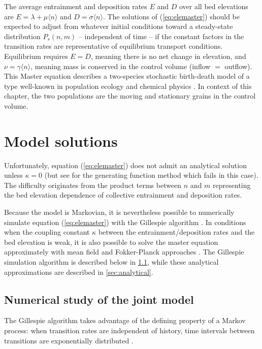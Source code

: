 The average entrainment and deposition rates $E$ and $D$ over all bed elevations are $E = \lambda +\mu \langle n \rangle$ and $D=\sigma \langle n \rangle$.
The solutions of (\ref{eq:elemaster}) should be expected to adjust from whatever initial conditions toward a steady-state distribution $P_s(n,m)$ -- independent of time -- if the constant factors in the transition rates are representative of equilibrium transport conditions.
Equilibrium requires $E=D$, meaning there is no net change in elevation, and $\nu = \gamma \langle n \rangle$, meaning mass is conserved in the control volume (inflow $=$ outflow).
This Master equation describes a two-species stochastic birth-death model \citep{Cox1965} of a type well-known in population ecology \citep{Pielou1977, Swift2002} and chemical physics \citep{Gardiner1983}.
In context of this chapter, the two populations are the moving and stationary grains in the control volume.

\section{Model solutions}
\label{sec:elesolution}

Unfortunately, equation (\ref{eq:elemaster}) does not admit an analytical solution unless $\kappa=0$ (but see \citet{Swift2002} for the generating function method which fails in this case).
The difficulty originates from the product terms between $n$ and $m$ representing the bed elevation dependence of collective entrainment and deposition rates.

Because the model is Markovian, it is nevertheless possible to numerically simulate equation (\ref{eq:elemaster}) with the Gillespie algorithm \citep{Gillespie1977, Gillespie1991, Gillespie2007}. 
In conditions when the coupling constant $\kappa$ between the entrainment/deposition rates and the bed elevation is weak, it is also possible to solve the master equation approximately with mean field and Fokker-Planck approaches \citep{Haken1978,Gardiner1983}.
The Gillespie simulation algorithm is described below in \ref{sec:numerical}, while these analytical approximations are described in \ref{sec:analytical}.

\subsection{Numerical study of the joint model}
\label{sec:numerical}

The Gillespie algorithm takes advantage of the defining property of a Markov process: when transition rates are independent of history, time intervals between transitions are
exponentially distributed \citep{Cox1965}.


